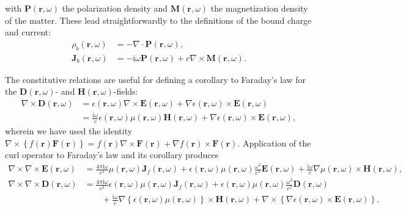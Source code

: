 with $\mathbf{P}(\mathbf{r},\omega)$ the polarization density and $\mathbf{M}(\mathbf{r},\omega)$ the magnetization density of the matter. These lead straightforwardly to the definitions of the bound charge and current:
\begin{equation}
\begin{split}
\rho_b(\mathbf{r},\omega) &= -\nabla\cdot\mathbf{P}(\mathbf{r},\omega),\\
\mathbf{J}_b(\mathbf{r},\omega) &= -\mathrm{i}\omega\mathbf{P}(\mathbf{r},\omega) + c\nabla\times\mathbf{M}(\mathbf{r},\omega).
\end{split}
\end{equation}

The constitutive relations are useful for defining a corollary to Faraday's law for the $\mathbf{D}(\mathbf{r},\omega)$- and $\mathbf{H}(\mathbf{r},\omega)$-fields:
\begin{equation}
\begin{split}
\nabla\times\mathbf{D}(\mathbf{r},\omega) &= \epsilon(\mathbf{r},\omega)\nabla\times\mathbf{E}(\mathbf{r},\omega) + \nabla\epsilon(\mathbf{r},\omega)\times\mathbf{E}(\mathbf{r},\omega)\\
&= \frac{\mathrm{i}\omega}{c}\epsilon(\mathbf{r},\omega)\mu(\mathbf{r},\omega)\mathbf{H}(\mathbf{r},\omega) + \nabla\epsilon(\mathbf{r},\omega)\times\mathbf{E}(\mathbf{r},\omega),
\end{split}
\end{equation}
wherein we have used the identity $\nabla\times\left\{f(\mathbf{r})\mathbf{F}(\mathbf{r})\right\} = f(\mathbf{r})\nabla\times\mathbf{F}(\mathbf{r}) + \nabla f(\mathbf{r})\times\mathbf{F}(\mathbf{r})$. Application of the curl operator to Faraday's law and its corollary produces
\begin{equation}\label{eq:waveEquationsEandD}
\begin{split}
\nabla\times\nabla\times\mathbf{E}(\mathbf{r},\omega) &= \frac{4\pi\mathrm{i}\omega}{c^2}\mu(\mathbf{r},\omega)\mathbf{J}_f(\mathbf{r},\omega) + \epsilon(\mathbf{r},\omega)\mu(\mathbf{r},\omega)\frac{\omega^2}{c^2}\mathbf{E}(\mathbf{r},\omega) + \frac{\mathrm{i}\omega}{c}\nabla\mu(\mathbf{r},\omega)\times\mathbf{H}(\mathbf{r},\omega),\\
\nabla\times\nabla\times\mathbf{D}(\mathbf{r},\omega) &= \frac{4\pi\mathrm{i}\omega}{c^2}\epsilon(\mathbf{r},\omega)\mu(\mathbf{r},\omega)\mathbf{J}_f(\mathbf{r},\omega) + \epsilon(\mathbf{r},\omega)\mu(\mathbf{r},\omega)\frac{\omega^2}{c^2}\mathbf{D}(\mathbf{r},\omega)\\
&\qquad + \frac{\mathrm{i}\omega}{c}\nabla\left\{\epsilon(\mathbf{r},\omega)\mu(\mathbf{r},\omega)\right\}\times\mathbf{H}(\mathbf{r},\omega) + \nabla\times\left\{\nabla\epsilon(\mathbf{r},\omega)\times\mathbf{E}(\mathbf{r},\omega)\right\}.
\end{split}
\end{equation}
